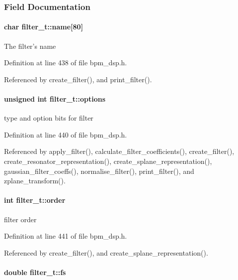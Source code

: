 \subsubsection{Field Documentation}
\paragraph[name]{\setlength{\rightskip}{0pt plus 5cm}char {\bf filter\_\-t::name}[80]}\hfill\label{structfilter__t_420d5f6fd6f7b83fb674fe5a81c18425}


The filter's name 

Definition at line 438 of file bpm\_\-dsp.h.

Referenced by create\_\-filter(), and print\_\-filter().
\paragraph[options]{\setlength{\rightskip}{0pt plus 5cm}unsigned int {\bf filter\_\-t::options}}\hfill\label{structfilter__t_f1f1d9266ba72eda6685c631f4dde41f}


type and option bits for filter 

Definition at line 440 of file bpm\_\-dsp.h.

Referenced by apply\_\-filter(), calculate\_\-filter\_\-coefficients(), create\_\-filter(), create\_\-resonator\_\-representation(), create\_\-splane\_\-representation(), gaussian\_\-filter\_\-coeffs(), normalise\_\-filter(), print\_\-filter(), and zplane\_\-transform().
\paragraph[order]{\setlength{\rightskip}{0pt plus 5cm}int {\bf filter\_\-t::order}}\hfill\label{structfilter__t_300a7f45bc8727f2c77cf1d9845deb96}


filter order 

Definition at line 441 of file bpm\_\-dsp.h.

Referenced by create\_\-filter(), and create\_\-splane\_\-representation().
\paragraph[fs]{\setlength{\rightskip}{0pt plus 5cm}double {\bf filter\_\-t::fs}}\hfill\label{structfilter__t_fcb71153474c026e4af9eb79e134272c}


